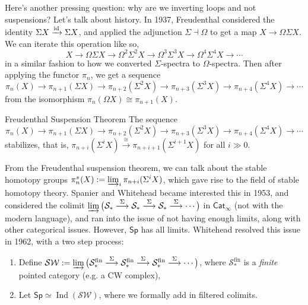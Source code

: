 Here's another pressing question: why are we inverting loops and not suspensions? Let's talk about history. In 1937, Freudenthal considered the identity $\Sigma X \xrightarrow{\operatorname{id}} \Sigma X$, and applied the adjunction $\Sigma \dashv \Omega$ to get a map $X \to \Omega \Sigma X$. We can iterate this operation like so, \[
X \longrightarrow \Omega \Sigma X \longrightarrow \Omega ^2 \Sigma ^2 X \longrightarrow \Omega ^3 \Sigma ^3 X \longrightarrow \Omega ^4 \Sigma ^4 X \longrightarrow \cdots 
\] in a similar fashion to how we converted $\Sigma$-spectra to $\Omega$-spectra. Then after applying the functor $\pi_n $, we get a sequence\[
\pi_n (X) \longrightarrow \pi_{n+1}(\Sigma X) \longrightarrow \pi_{n+2}(\Sigma ^2 X) \longrightarrow \pi _{n+3}(\Sigma ^3 X) \longrightarrow \pi _{n+4}(\Sigma ^4 X) \longrightarrow \cdots 
\] from the isomorphism $\pi_n (\Omega X) \cong\pi_{n+1}(X)$.
\begin{namedthm}{Freudenthal Suspension Theorem} 
   The sequence \[
\pi_n (X) \longrightarrow \pi_{n+1}(\Sigma X) \longrightarrow \pi_{n+2}(\Sigma ^2 X) \longrightarrow \pi _{n+3}(\Sigma ^3 X) \longrightarrow \pi _{n+4}(\Sigma ^4 X) \longrightarrow \cdots 
   \] 
   stabilizes, that is, $\pi _{n+i}(\Sigma ^i  X) \xrightarrow{\cong} \pi _{n+i+1}(\Sigma ^{i+1}X)$ for all $i \gg 0$.
\end{namedthm}From the Freudenthal suspension theorem, we can talk about the stable homotopy groups $\pi _n ^s(X) := \varinjlim_i  \pi _{n+i}(\Sigma ^i  X)$, which gave rise to the field of stable homotopy theory. Spanier and Whitehead became interested this in 1953, and considered the colimit $\varinjlim \big(\mathcal{S} _* \overset{\Sigma}{\longrightarrow} \mathcal{S} _* \overset{\Sigma}{\longrightarrow}\mathcal{S} _* \overset{\Sigma}{\longrightarrow}\cdots \big)$ in $\mathsf{Cat} _{\infty}$ (not with the modern language), and ran into the issue of not having enough limits, along with other categorical issues. However, $\mathsf{Sp} $ has all limits. Whitehead resolved this issue in 1962, with a two step process:
\begin{enumerate}[label=(\arabic*)]
\setlength\itemsep{-.2em}
    \item Define $\mathcal{SW} := \varinjlim \big( \mathcal{S} _*^{\mathrm{fin}}\overset{\Sigma}{\longrightarrow} \mathcal{S} _*^{\mathrm{fin}}\overset{\Sigma}{\longrightarrow}\mathcal{S} _*^{\mathrm{fin}}\overset{\Sigma}{\longrightarrow}\cdots \big)$, where $\mathcal{S} _*^{\mathrm{fin}}$ is a \emph{finite} pointed category (e.g. a CW complex),
    \item Let $\mathsf{Sp} \simeq \operatorname{Ind}(\mathcal{SW} )$, where we formally add in filtered colimits.
\end{enumerate}
